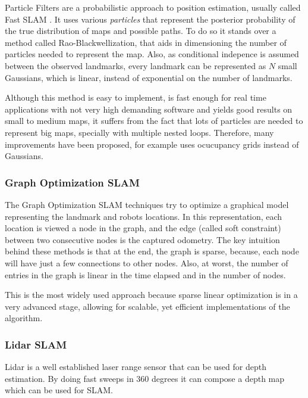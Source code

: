       Particle Filters are a probabilistic approach to position estimation, usually called Fast SLAM \cite{Montemerlo2002}. It uses various \textit{particles} that represent the posterior probability of the true distribution of maps and possible paths. To do so it stands over a method called Rao-Blackwellization, that aids in dimensioning the number of particles needed to represent the map. Also, as conditional indepence is assumed between the observed landmarks, every landmark can be represented as $N$ small Gaussians, which is linear, instead of exponential on the number of landmarks.

      Although this method is easy to implement, is fast enough for real time applications with not very high demanding software and yields good results on small to medium maps, it suffers from the fact that lots of particles are needed to represent big maps, specially with multiple nested loops. Therefore, many improvements have been proposed, \cite{Grisetti2007} for example uses ocucupancy grids instead of Gaussians.

    \subsubsection{Graph Optimization SLAM}

      The Graph Optimization SLAM techniques try to optimize a graphical model representing the landmark and robots locations. In this representation, each location is viewed a node in the graph, and the edge (called soft constraint) between two consecutive nodes is the captured odometry. The key intuition behind these methods is that at the end, the graph is sparse, because, each node will have just a few connections to other nodes. Also, at worst, the number of entries in the graph is linear in the time elapsed and in the number of nodes.

      This is the most widely used approach because sparse linear optimization is in a very advanced stage, allowing for scalable, yet efficient implementations of the algorithm.

    \subsubsection{Lidar SLAM}

      Lidar is a well established laser range sensor that can be used for depth estimation. By doing fast sweeps in 360 degrees it can compose a depth map which can be used for SLAM.


